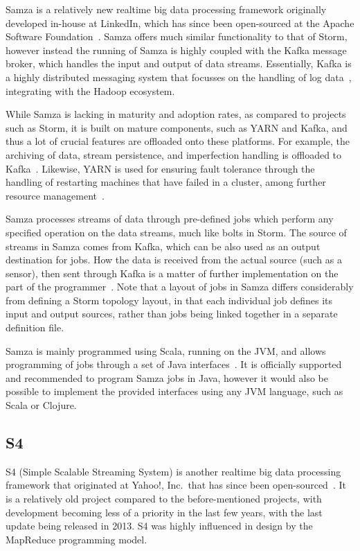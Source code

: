 Samza is a relatively new realtime big data processing framework originally developed in-house at LinkedIn, which has since been
open-sourced at the Apache Software Foundation~\cite{web_samza}. Samza offers much similar functionality to that of
Storm, however instead the running of Samza is highly coupled with the Kafka message broker, which handles the input
and output of data streams. Essentially, Kafka is a highly distributed messaging system that focusses on the handling
of log data~\cite{kreps2011kafka}, integrating with the Hadoop ecosystem.

While Samza is lacking in maturity and adoption rates, as compared to projects such as Storm, it is built on mature
components, such as YARN and Kafka, and thus a lot of crucial features are offloaded onto these platforms. For example,
the archiving of data, stream persistence, and imperfection handling is offloaded to Kafka~\cite{bockermann2014survey}.
Likewise, YARN is used for ensuring fault tolerance through the handling of restarting machines that have failed in a
cluster, among further resource management~\cite{bockermann2014survey}.

Samza processes streams of data through pre-defined jobs which perform any specified operation on the data streams, much
like bolts in Storm. The source of streams in Samza comes from Kafka, which can be also used as an output destination
for jobs. How the data is received from the actual source (such as a sensor), then sent through Kafka is a matter of
further implementation on the part of the programmer~\cite{yangradstack}. Note that a layout of jobs in Samza differs considerably from defining
a Storm topology layout, in that each individual job defines its input and output sources, rather than jobs being
linked together in a separate definition file.

Samza is mainly programmed using Scala, running on the JVM, and allows programming of jobs through a set of Java
interfaces~\cite{Samza6:online}. It is officially supported and recommended to program Samza jobs in Java, however it
would also be possible to implement the provided interfaces using any JVM language, such as Scala or Clojure.



\subsection{S4} %
\label{ssub:s4}

S4 (Simple Scalable Streaming System) is another realtime big data processing framework that originated at Yahoo!, Inc.\
that has since been open-sourced~\cite{neumeyer2010s4}. It is a relatively old project compared to the before-mentioned
projects, with development becoming less of a priority in the last few years, with the last update being released in 2013.
S4 was highly influenced in design by the MapReduce programming model.

